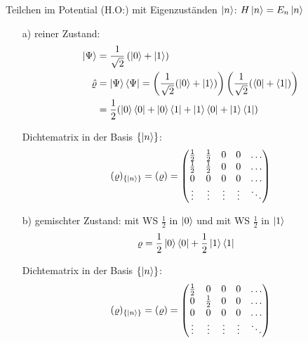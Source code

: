 \begin{beispiel}{Teilchen im Potential (H.O:) mit Eigenzuständen $\ket{n}$:}
$H\ket{n} = E_n \ket{n}$
\begin{itemize}
    \item[a)] reiner Zustand: 
    \begin{align}
        \ket{\Psi} &= \frac{1}{\sqrt{2}} \left( \ket{0} + \ket{1} \right) \\
        \Hat{\varrho} &= \ket{\Psi}\bra{\Psi} = \left( \frac{1}{\sqrt{2}} ( \ket{0} + \ket{1}) \right) \left(\frac{1}{\sqrt{2}} ( \bra{0} + \bra{1}) \right) \\
        &= \frac{1}{2}(\ket{0}\bra{0} + \ket{0}\bra{1} + \ket{1}\bra{0} + \ket{1}\bra{1})
    \end{align}
    \item[] Dichtematrix in der Basis $\{ \ket{n} \}$:
    \begin{equation}
        (\varrho)_{\{ \ket{n} \}} = (\varrho) = \begin{pmatrix}
            \frac{1}{2} & \frac{1}{2} & 0 & 0 & \dots \\
            \frac{1}{2} & \frac{1}{2} & 0 & 0 & \dots \\
            0 & 0 & 0 & 0 & \dots \\
            \vdots & \vdots & \vdots & \vdots & \ddots
            \end{pmatrix}
    \end{equation}
    \item[b)] gemischter Zustand: mit WS $\frac{1}{2}$ in $\ket{0}$ und mit WS $\frac{1}{2}$ in $\ket{1}$
    \begin{align}
        \varrho &= \frac{1}{2} \ket{0}\bra{0} + \frac{1}{2} \ket{1}\bra{1}
    \end{align}
    \item[] Dichtematrix in der Basis $\{ \ket{n} \}$:
    \begin{equation}
        (\varrho)_{\{ \ket{n} \}} = (\varrho) = \begin{pmatrix}
            \frac{1}{2} & 0 & 0 & 0 & \dots \\
            0 & \frac{1}{2} & 0 & 0 & \dots \\
            0 & 0 & 0 & 0 & \dots \\
            \vdots & \vdots & \vdots & \vdots & \ddots
        \end{pmatrix}
    \end{equation}
\end{itemize}
\end{beispiel}





